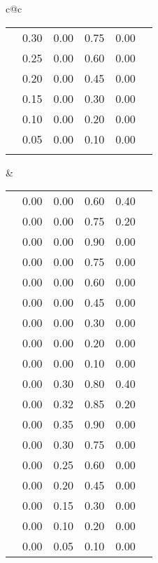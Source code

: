\begin{footnotesize}
\begin{tabular}{c@{\quad}c}
\begin{tabular}{|c|c|cccc|}
\clrow{darklimegreen}           & 0.30 & 0.00 & 0.75 & 0.00 \\
\clrow{limegreen}               & 0.25 & 0.00 & 0.60 & 0.00 \\
\clrow{lightlimegreen}          & 0.20 & 0.00 & 0.45 & 0.00 \\
\clrow{verylightlimegreen}      & 0.15 & 0.00 & 0.30 & 0.00 \\
\clrow{palelimegreen}           & 0.10 & 0.00 & 0.20 & 0.00 \\
\clrow{verypalelimegreen}       & 0.05 & 0.00 & 0.10 & 0.00 \\
      \clspc
      \hline
    \end{tabular} 
   &
    \begin{tabular}{|c|c|cccc|} \hline
\clspc
\clrow{verydeepyellow}          & 0.00 & 0.00 & 0.60 & 0.40 \\
\clrow{deepyellow}              & 0.00 & 0.00 & 0.75 & 0.20 \\
\clrow{verydarkyellow}          & 0.00 & 0.00 & 0.90 & 0.00 \\
\clrow{darkyellow}              & 0.00 & 0.00 & 0.75 & 0.00 \\
\clrow{yellow}                  & 0.00 & 0.00 & 0.60 & 0.00 \\
\clrow{lightyellow}             & 0.00 & 0.00 & 0.45 & 0.00 \\
\clrow{verylightyellow}         & 0.00 & 0.00 & 0.30 & 0.00 \\
\clrow{paleyellow}              & 0.00 & 0.00 & 0.20 & 0.00 \\
\clrow{verypaleyellow}          & 0.00 & 0.00 & 0.10 & 0.00 \\
\clspc
\clrow{verydeeporange}          & 0.00 & 0.30 & 0.80 & 0.40 \\
\clrow{deeporange}              & 0.00 & 0.32 & 0.85 & 0.20 \\
\clrow{verydarkorange}          & 0.00 & 0.35 & 0.90 & 0.00 \\
\clrow{darkorange}              & 0.00 & 0.30 & 0.75 & 0.00 \\
\clrow{orange}                  & 0.00 & 0.25 & 0.60 & 0.00 \\
\clrow{lightorange}             & 0.00 & 0.20 & 0.45 & 0.00 \\
\clrow{verylightorange}         & 0.00 & 0.15 & 0.30 & 0.00 \\
\clrow{paleorange}              & 0.00 & 0.10 & 0.20 & 0.00 \\
\clrow{verypaleorange}          & 0.00 & 0.05 & 0.10 & 0.00 \\

\end{tabular}
\end{tabular}
\end{footnotesize}
